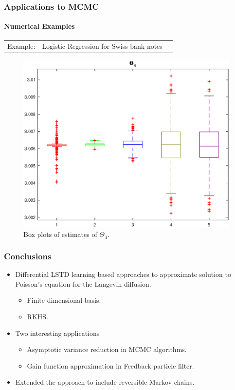 \documentclass[xcolor=dvipsnames, subsection=false]{beamer}
\def\alertb#1{\alert{\color{BrickRed}  #1}}
\def\alertb#1{\alert{\color{BrickRed}  #1}}
\begin{document}
\begin{frame}
\frametitle{Applications to MCMC}
\framesubtitle{Numerical Examples}
\begin{tabular}{lll}\alertb{Example:}   & Logistic Regression for Swiss bank notes
	\\
\end{tabular}
\begin{figure}[H]
	\begin{center}
	\includegraphics[width=0.6\hsize]{hist_Theta_4_no_std.eps}
	\tiny
	\caption{ Box plots of estimates of $\Theta_4$.}
	\end{center}
\end{figure}
\end{frame}

\begin{frame}
\frametitle{Conclusions}
\begin{itemize}
	\item Differential LSTD learning based approaches to approximate solution to Poisson's equation for the Langevin diffusion.\\[-0.1cm]
	 \begin{itemize}
	 	\item Finite dimensional basis.
	 	\item RKHS.
	 \end{itemize}
	\item Two interesting applications
	\begin{itemize}
		\item Asymptotic variance reduction in MCMC algorithms.
		\item Gain function approximation in Feedback particle filter.
	\end{itemize}
	\item Extended the approach to include reversible Markov chains.
\end{itemize}
\end{frame}
\end{document}
